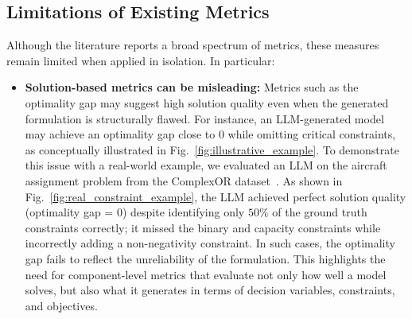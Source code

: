 \documentclass[review,12pt]{elsarticle}
\begin{document}
\subsection{Limitations of Existing Metrics}
Although the literature reports a broad spectrum of metrics, these measures remain limited when applied in isolation. In particular:
\vspace{-3mm}
\begin{itemize}
    \item \textbf{Solution-based metrics can be misleading:} Metrics such as the optimality gap may suggest high solution quality even when the generated formulation is structurally flawed. For instance, an LLM-generated model may achieve an optimality gap close to $0$ while omitting critical constraints, as conceptually illustrated in Fig.~\ref{fig:illustrative_example}. To demonstrate this issue with a real-world example, we evaluated an LLM on the aircraft assignment problem from the ComplexOR dataset~\cite{COMPLEXOR}. As shown in Fig.~\ref{fig:real_constraint_example}, the LLM achieved perfect solution quality (optimality gap = 0) despite identifying only $50$\% of the ground truth constraints correctly; it missed the binary and capacity constraints while incorrectly adding a non-negativity constraint. In such cases, the optimality gap fails to reflect the unreliability of the formulation. This highlights the need for component-level metrics that evaluate not only how well a model solves, but also what it generates in terms of decision variables, constraints, and objectives.


\begin{figure}[htbp]

\centering
{}
\end{figure}
\end{itemize}
\end{document}
